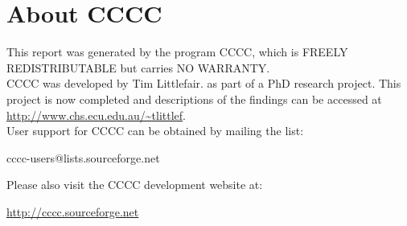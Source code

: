 \section{About CCCC}

This report was generated by the program CCCC, which is FREELY REDISTRIBUTABLE but carries NO WARRANTY. \\

CCCC was developed by Tim Littlefair. as part of a PhD research project. This project is now completed and descriptions of the findings can
be accessed at \url{http://www.chs.ecu.edu.au/~tlittlef}. \\

User support for CCCC can be obtained by mailing the list:
\begin{center}cccc-users@lists.sourceforge.net\end{center}

Please also visit the CCCC development website at:
\begin{center}\url{http://cccc.sourceforge.net}\end{center}
